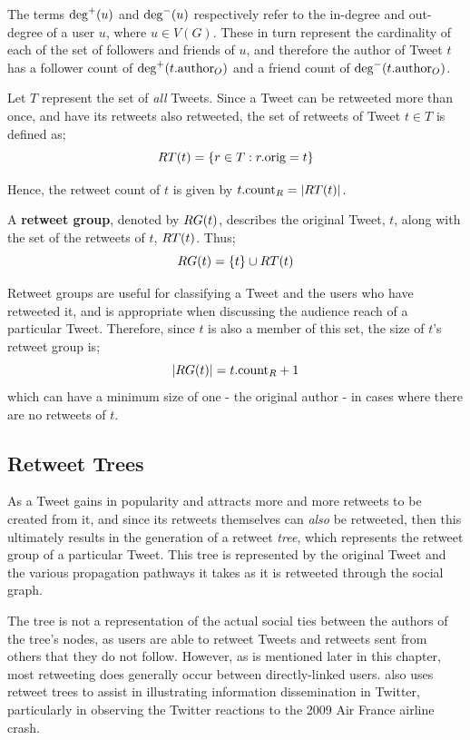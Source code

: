 The terms $\textrm{deg}^+(u)$ and $\textrm{deg}^-(u)$ respectively refer to the in-degree and out-degree of a user $u$, where $u \in V(G)$. These in turn represent the cardinality of each of the set of followers and friends of $u$, and therefore the author of Tweet $t$ has a follower count of $\textrm{deg}^+(t.\textrm{author}_O)$ and a friend count of $\textrm{deg}^-(t.\textrm{author}_O)$.

Let $T$ represent the set of \textit{all} Tweets. Since a Tweet can be retweeted more than once, and have its retweets also retweeted, the set of retweets of Tweet $t \in T$ is defined as;
\[
    RT(t) = \left\{ r \in T : r.\textrm{orig} = t \right\}
\]

Hence, the retweet count of $t$ is given by $ t.\textrm{count}_R = \left\vert{RT(t)}\right\vert $.


\begin{mydefinition}
A \textbf{retweet group}, denoted by $RG(t)$, describes the original Tweet, $t$, along with the set of the retweets of $t$, $RT(t)$. Thus;
\[
    RG(t) = \left\{t\right\} \cup RT(t)
\]
\end{mydefinition}


Retweet groups are useful for classifying a Tweet and the users who have retweeted it, and is appropriate when discussing the audience reach of a particular Tweet. Therefore, since $t$ is also a member of this set, the size of $t$'s retweet group is; 
\[
	\left\vert{
RG(t)}\right\vert = t.\textrm{count}_R + 1 
\] 
which can have a minimum size of one - the original author - in cases where there are no retweets of $t$.
 

\subsection{Retweet Trees}
As a Tweet gains in popularity and attracts more and more retweets to be created from it, and since its retweets themselves can \textit{also} be retweeted, then this ultimately results in the generation of a retweet \textit{tree}, which represents the retweet group of a particular Tweet. This tree is represented by the original Tweet and the various propagation pathways it takes as it is retweeted through the social graph. 

The tree is not a representation of the actual social ties between the authors of the tree's nodes, as users are able to retweet Tweets and retweets sent from others that they do not follow. However, as is mentioned later in this chapter, most retweeting does generally occur between directly-linked users. \cite{kwak10} also uses retweet trees to assist in illustrating information dissemination in Twitter, particularly in observing the Twitter reactions to the 2009 Air France airline crash.

